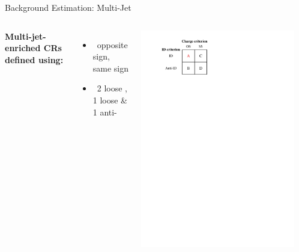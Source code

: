 \documentclass[11pt, xcolor={dvipsnames}, aspectratio=169, notes]{beamer}
\begin{document}

\begin{frame}{Background Estimation: Multi-Jet}
  \begin{columns}[onlytextwidth]

    \textbf{Multi-jet-enriched CRs defined using:}
    \begin{itemize}
      \setlength{\itemsep}{0.5em}

    \item {}\ opposite sign, same sign

    \item {}\ 2 loose \tauhadvis, \\1 loose
      \tauhadvis \& 1 anti-\tauhadvis

    \end{itemize}


    \vspace*{1em}

    \hfill\includegraphics[width=0.92\textwidth]{ff_sketch}


\end{columns}
\end{frame}
\end{document}
